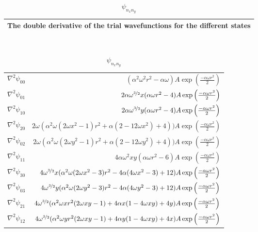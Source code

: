 \begin{table}[H]\caption{$\psi_{n_xn_y}$}\label{tab:doble_derivative_single_particle_trial_wavefunctions}
\begin{tabular}{l}
The double derivative of the trial wavefunctions for the different states\\ \hline
\end{tabular}\\
\begin{tabular}{l|r}
\large $\nabla^2 \psi_{00}$ & \large $ (\alpha^2\omega^2 r^2-\alpha\omega) A\exp\left({\frac{-\alpha\omega r^2}{2}}\right)$\\
\large $\nabla^2 \psi_{01}$ & \large $2\alpha \omega^{\nicefrac{3}{2}} x (\alpha \omega r^2 -4)A\exp\left({\frac{-\alpha\omega r^2}{2}}\right)$\\
\large $\nabla^2 \psi_{10}$ & \large $2\alpha \omega^{\nicefrac{3}{2}} y (\alpha \omega r^2 -4)A\exp\left({\frac{-\alpha\omega r^2}{2}}\right)$\\
\large $\nabla^2 \psi_{20}$ & \large $2\omega(\alpha^2 \omega (2\omega x^2 -1)r^2 + \alpha (2-12 \omega x^2) + 4)) A\exp\left({\frac{-\alpha\omega r^2}{2}}\right)$\\
\large $\nabla^2 \psi_{02}$ & \large $2\omega(\alpha^2 \omega (2\omega y^2 -1)r^2 + \alpha (2-12 \omega y^2) + 4)) A\exp\left({\frac{-\alpha\omega r^2}{2}}\right)$\\
\large $\nabla^2 \psi_{11}$ & \large $4\alpha \omega^2 xy(\alpha \omega r^2 - 6)A\exp\left({\frac{-\alpha\omega r^2}{2}}\right)$\\
\large $\nabla^2 \psi_{30}$ & \large $ 4 \omega^{\nicefrac{3}{2}} x (\alpha^2 \omega (2 \omega x^2 - 3) r^2 - 4 \alpha (4 \omega x^2 - 3) + 12) A\exp\left({\frac{-\alpha\omega r^2}{2}}\right)$\\
\large $\nabla^2 \psi_{03}$ & \large$ 4 \omega^{\nicefrac{3}{2}} y (\alpha^2 \omega (2 \omega y^2 - 3) r^2 - 4 \alpha (4 \omega y^2 - 3) + 12) A\exp\left({\frac{-\alpha\omega r^2}{2}}\right)$\\
\large $\nabla^2 \psi_{21}$ & \large $4 \omega^{\nicefrac{3}{2}} (\alpha^2 \omega x r^2 (2 \omega x y - 1) + 4 \alpha x (1 - 4\omega x y) + 4 y)A\exp\left({\frac{-\alpha\omega r^2}{2}}\right)$\\
\large $\nabla^2 \psi_{12}$ & \large $4 \omega^{\nicefrac{3}{2}} (\alpha^2 \omega y r^2 (2 \omega x y - 1) + 4 \alpha y (1 - 4\omega x y) + 4 x)A\exp\left({\frac{-\alpha\omega r^2}{2}}\right)$\\
\end{tabular}
\end{table}

